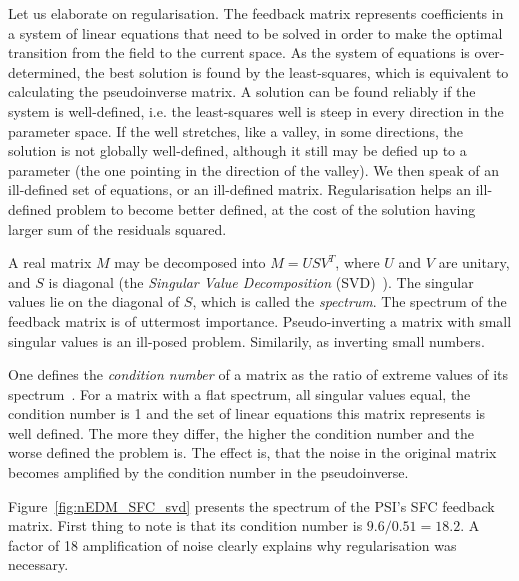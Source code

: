 Let us elaborate on regularisation. The feedback matrix represents coefficients in a system of linear equations that need to be solved in order to make the optimal transition from the field to the current space. As the system of equations is over-determined, the best solution is found by the least-squares, which is equivalent to calculating the pseudoinverse matrix. A solution can be found reliably if the system is well-defined, i.e. the least-squares well is steep in every direction in the parameter space. If the well stretches, like a valley, in some directions, the solution is not globally well-defined, although it still may be defied up to a parameter (the one pointing in the direction of the valley). We then speak of an ill-defined set of equations, or an ill-defined matrix. Regularisation helps an ill-defined problem to become better defined, at the cost of the solution having larger sum of the residuals squared.

A real matrix $M$ may be decomposed into $M = U S V^T$, where $U$ and $V$ are unitary, and $S$ is diagonal (the \emph{Singular Value Decomposition} (SVD)~\cite{Golub1965}). The singular values lie on the diagonal of $S$, which is called the \emph{spectrum}. The spectrum of the feedback matrix is of uttermost importance. Pseudo-inverting a matrix with small singular values is an ill-posed problem. Similarily, as inverting small numbers.

One defines the \emph{condition number} of a matrix as the ratio of extreme values of its spectrum~\cite{Regression}. For a matrix with a flat spectrum, all singular values equal, the condition number is 1 and the set of linear equations this matrix represents is well defined. The more they differ, the higher the condition number and the worse defined the problem is. The effect is, that the noise in the original matrix becomes amplified by the condition number in the pseudoinverse.

Figure~\ref{fig:nEDM_SFC_svd} presents the spectrum of the PSI's SFC feedback matrix. First thing to note is that its condition number is $9.6 / 0.51 = 18.2$. A factor of 18 amplification of noise clearly explains why regularisation was necessary.

